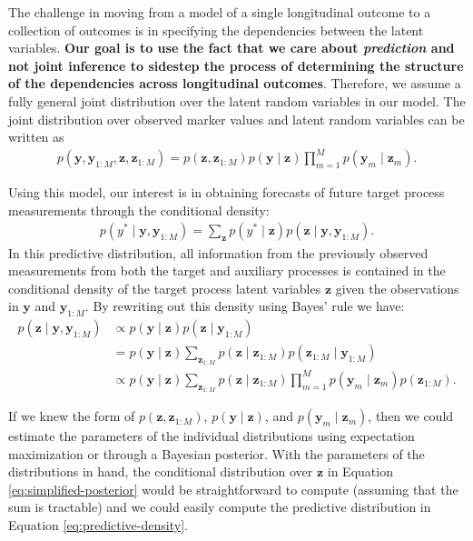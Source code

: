 \documentclass[12pt]{article}
\newcommand{\given}{\mid}
\begin{document}
The challenge in moving from a model of a single longitudinal outcome to a collection of outcomes is in specifying the dependencies between the latent variables. \textbf{Our goal is to use the fact that we care about \emph{prediction} and not joint inference to sidestep the process of determining the structure of the dependencies across longitudinal outcomes}. Therefore, we assume a fully general joint distribution over the latent random variables in our model. The joint distribution over observed marker values and latent random variables can be written as
\begin{align}
p(\bm{y}, \bm{y}_{1:M}, \bm{z}, \bm{z}_{1:M}) = p(\bm{z}, \bm{z}_{1:M}) p(\bm{y} \given \bm{z}) \prod_{m=1}^M p(\bm{y}_m \given \bm{z}_m).
\end{align}

Using this model, our interest is in obtaining forecasts of future target process measurements through the conditional density:
\begin{align}
\label{eq:predictive-density}
p(y^* \given \bm{y}, \bm{y}_{1:M}) =
	\sum_{\bm{z}} p(y^* \given \bm{z}) p(\bm{z} \given \bm{y}, \bm{y}_{1:M}).
\end{align}
In this predictive distribution, all information from the previously observed measurements from both the target and auxiliary processes is contained in the conditional density of the target process latent variables $\bm{z}$ given the observations in $\bm{y}$ and $\bm{y}_{1:M}$. By rewriting out this density using Bayes' rule we have:
\begin{align}
p(\bm{z} \given \bm{y}, \bm{y}_{1:M})
	&\propto p(\bm{y} \given \bm{z}) p(\bm{z} \given \bm{y}_{1:M}) \\
	&=       p(\bm{y} \given \bm{z}) \sum_{\bm{z}_{1:M}} p(\bm{z} \given \bm{z}_{1:M}) p(\bm{z}_{1:M} \given \bm{y}_{1:M}) \\
	\label{eq:simplified-posterior}
	&\propto p(\bm{y} \given \bm{z}) \sum_{\bm{z}_{1:M}} p(\bm{z} \given \bm{z}_{1:M}) \prod_{m=1}^M p(\bm{y}_m \given \bm{z}_m) p(\bm{z}_{1:M}).
\end{align}

If we knew the form of $p(\bm{z}, \bm{z}_{1:M})$, $p(\bm{y} \given \bm{z})$, and $p(\bm{y}_m \given \bm{z}_m)$, then we could estimate the parameters of the individual distributions using expectation maximization or through a Bayesian posterior. With the parameters of the distributions in hand, the conditional distribution over $\bm{z}$ in Equation \ref{eq:simplified-posterior} would be straightforward to compute (assuming that the sum is tractable) and we could easily compute the predictive distribution in Equation \ref{eq:predictive-density}.
\end{document}

